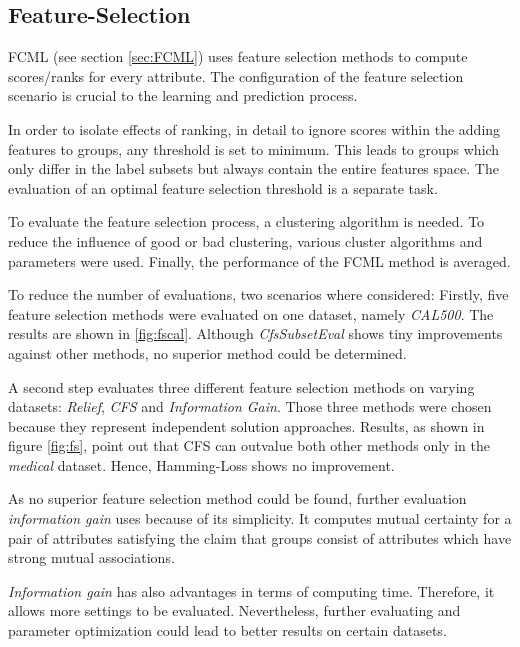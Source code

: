 		\subsection{Feature-Selection}

		FCML (see section \ref{sec:FCML}) uses feature selection methods to compute scores/ranks for every attribute. The configuration of the feature selection scenario is crucial to the learning and prediction process. 

		In order to isolate effects of ranking, in detail to ignore scores within the adding features to groups, any threshold is set to minimum. This leads to groups which only differ in the label subsets but always contain the entire features space. The evaluation of an optimal feature selection threshold is a separate task.
		
		To evaluate the feature selection process, a clustering algorithm is needed. To reduce the influence of good or bad clustering, various cluster algorithms and parameters were used. Finally, the performance of the FCML method is averaged.

		To reduce the number of evaluations, two scenarios where considered: Firstly, five feature selection methods were evaluated on one dataset, namely \textit{CAL500}. The results are shown in \ref{fig:fscal}. Although \textit{CfsSubsetEval} shows tiny improvements against other methods, no superior method could be determined.

		A second step evaluates three different feature selection methods on varying datasets: \textit{Relief}, \textit{CFS} and \textit{Information Gain}. Those three methods were chosen because they represent independent solution approaches. Results, as shown in figure \ref{fig:fs}, point out that CFS can outvalue both other methods only in the \textit{medical} dataset. Hence, Hamming-Loss shows no improvement.

		As no superior feature selection method could be found, further evaluation \textit{information gain} uses because of its simplicity. It computes mutual certainty for a pair of attributes satisfying the claim that groups consist of attributes which have strong mutual associations.
				
		\textit{Information gain} has also advantages in terms of computing time. Therefore, it allows more settings to be evaluated. Nevertheless, further evaluating and parameter optimization could lead to better results on certain datasets.

